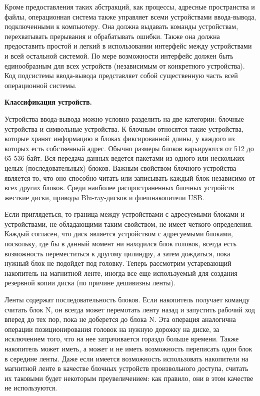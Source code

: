 Кроме предоставления таких абстракций, как процессы, адресные пространства и файлы, операционная система также управляет всеми устройствами ввода-вывода, подключенными к компьютеру. Она должна выдавать команды устройствам, перехватывать прерывания и обрабатывать ошибки. Также она должна предоставить простой и легкий в использовании интерфейс между устройствами и всей остальной системой. По мере возможности интерфейс должен быть единообразным для всех устройств (независимым от конкретного устройства). Код подсистемы ввода-вывода представляет собой существенную часть всей операционной системы.

\begin{center}{\bfseries Классификация устройств.}
\end{center}

Устройства ввода-вывода можно условно разделить на две категории: блочные устройства и символьные устройства. К блочным относятся такие устройства, которые хранят информацию в блоках фиксированной длины, у каждого из которых есть собственный адрес. Обычно размеры блоков варьируются от 512 до 65 536 байт. Вся передача данных ведется пакетами из одного или нескольких целых (последовательных) блоков. Важным свойством блочного устройства является то, что оно способно читать или записывать каждый блок независимо от всех других блоков. Среди наиболее распространенных блочных устройств жесткие диски, приводы Blu-ray-дисков и флешнакопители USB.

Если приглядеться, то граница между устройствами с адресуемыми блоками и устройствами, не обладающими таким свойством, не имеет четкого определения. Каждый согласен, что диск является устройством с адресуемыми блоками, поскольку, где бы в данный момент ни находился блок головок, всегда есть возможность переместиться к другому цилиндру, а затем дождаться, пока нужный блок не подойдет под головку. Теперь рассмотрим устаревающий накопитель на магнитной ленте, иногда все еще используемый для создания резервной копии диска (по причине дешивизны ленты).

Ленты содержат последовательность блоков. Если накопитель получает команду считать блок N, он всегда может перемотать ленту назад и запустить рабочий ход вперед до тех пор, пока не доберется до блока N. Эта операция аналогична операции позиционирования головок на нужную дорожку на диске, за исключением того, что на нее затрачивается гораздо больше времени. Также накопитель может иметь, а может и не иметь возможность переписать один блок в середине ленты. Даже если имеется возможность использовать накопители на магнитной ленте в качестве блочных устройств произвольного доступа, считать их таковыми будет некоторым преувеличением: как правило, они в этом качестве не используются.

